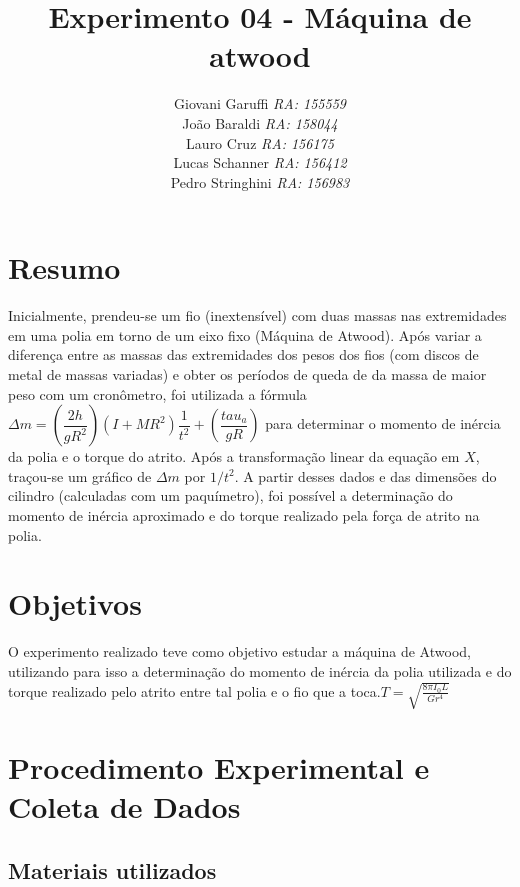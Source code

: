 \documentclass[12pt,a4paper]{article}
\begin{document}
\title{\vspace{70mm}\Huge Experimento 04 - Máquina de atwood}
\author{ Giovani Garuffi\qquad\hfill
		\textit {RA: 155559}\protect\\
		João Baraldi\hfill
		\textit{RA: 158044}\protect\\
		Lauro Cruz\hfill
		\textit{RA: 156175}\protect\\
		Lucas Schanner\hfill
		\textit{RA: 156412}\protect\\
		Pedro Stringhini\hfill
		\textit {RA: 156983}								
		}
\maketitle
\newpage
\section{Resumo}
Inicialmente, prendeu-se um fio (inextensível) com duas massas nas extremidades em uma polia em torno de um eixo fixo (Máquina de Atwood). Após variar a diferença entre as massas das extremidades dos pesos dos fios (com discos de metal de massas variadas) e obter os períodos de queda de da massa de maior peso com um cronômetro, foi utilizada a fórmula $\Delta m = (\dfrac{2h}{gR^2})(I + MR^2)\dfrac{1}{t^2}+(\dfrac{tau_a}{gR})$ para determinar o momento de inércia da polia e o torque do atrito.
Após a transformação linear da equação em $X$, traçou-se um gráfico de $\Delta m$ por $1/t^2$. A partir desses dados e das dimensões do cilindro (calculadas com um paquímetro), foi possível a determinação do momento de inércia aproximado e do torque realizado pela força de atrito na polia.

\section{Objetivos}
O experimento realizado teve como objetivo estudar a máquina de Atwood, utilizando para isso a determinação do momento de inércia da polia utilizada e do torque realizado pelo atrito entre tal polia e o fio que a toca.$T = \sqrt{\frac{8\pi I_0 L}{G r^4}}$


\section{Procedimento Experimental e Coleta de Dados}

\subsection{Materiais utilizados}
\end{document}
